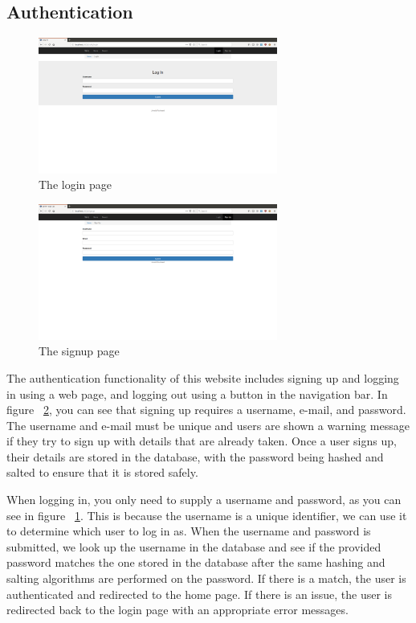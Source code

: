 \subsection{Authentication}

\begin{figure}[H]
    \centering
    \includegraphics[width=0.7\textwidth]{final_report/pics/login.png}
    \caption{The login page}
    \label{fig:wireLogin}
\end{figure}

\begin{figure}[H]
    \centering
    \includegraphics[width=0.7\textwidth]{final_report/pics/signup.png}
    \caption{The signup page}
    \label{fig:wireSignup}
\end{figure}

The authentication functionality of this website includes signing up and
logging in using a web page, and logging out using a button in the navigation
bar. In figure ~\ref{fig:wireSignup}, you can see that signing up requires
a username, e-mail, and password. The username and e-mail must be unique and
users are shown a warning message if they try to sign up with details that
are already taken. Once a user signs up, their details are stored in the
database, with the password being hashed and salted to ensure that it is
stored safely.

When logging in, you only need to supply a username and password, as you can
see in figure ~\ref{fig:wireLogin}. This is because the username is a unique
identifier, we can use it to determine which user to log in as. When the username
and password is submitted, we look up the username in the database and see if
the provided password matches the one stored in the database after the same
hashing and salting algorithms are performed on the password. If there is a
match, the user is authenticated and redirected to the home page. If there
is an issue, the user is redirected back to the login page with an appropriate
error messages.

